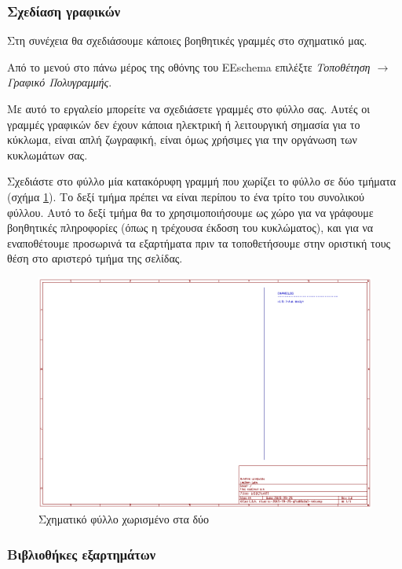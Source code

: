 \documentclass[a4paper]{article}
\begin{document}
\subsubsection{Σχεδίαση γραφικών}

Στη συνέχεια θα σχεδιάσουμε κάποιες βοηθητικές γραμμές στο σχηματικό μας.

Από το μενού στο πάνω μέρος της οθόνης του \textenglish{EEschema} επιλέξτε \textit{Τοποθέτηση $\rightarrow$ Γραφικό Πολυγραμμής}.

Με αυτό το εργαλείο μπορείτε να σχεδιάσετε γραμμές στο φύλλο σας. Αυτές οι γραμμές γραφικών δεν έχουν κάποια ηλεκτρική ή λειτουργική σημασία για το κύκλωμα, είναι απλή ζωγραφική, είναι όμως χρήσιμες για την οργάνωση των κυκλωμάτων σας.

Σχεδιάστε στο φύλλο μία κατακόρυφη γραμμή που χωρίζει το φύλλο σε δύο τμήματα (σχήμα \ref{fig:eesch-main-lines}). Το δεξί τμήμα πρέπει να είναι περίπου το ένα τρίτο του συνολικού φύλλου. Αυτό το δεξί τμήμα θα το χρησιμοποιήσουμε ως χώρο για να γράφουμε  βοηθητικές πληροφορίες (όπως η τρέχουσα έκδοση του κυκλώματος), και για να εναποθέτουμε προσωρινά τα εξαρτήματα πριν τα τοποθετήσουμε στην οριστική τους θέση στο αριστερό τμήμα της σελίδας.

\begin{figure}
  \begin{center}
    \includegraphics[width=.9\textwidth]{img/eesch-main-lines.png}
    \caption{Σχηματικό φύλλο χωρισμένο στα δύο}
    \label{fig:eesch-main-lines}
  \end{center}
\end{figure}

\subsubsection{Βιβλιοθήκες εξαρτημάτων}
\end{document}
